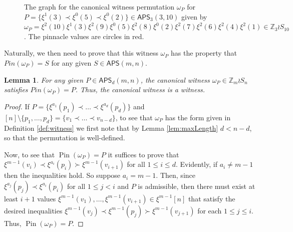 \documentclass[12pt,reqno]{amsart}
\numberwithin{equation}{section}
\theoremstyle{plain}
\newtheorem{lemma}[theorem]{Lemma}
\theoremstyle{definition}
\theoremstyle{remark}
\newcommand{\Z}{\mathbb{Z}}
\newcommand{\Pin}{\operatorname{Pin}}
\newcommand\APS{\mathsf{APS}}
\begin{document}
\begin{figure}[ht]
\caption{The graph for the canonical witness permutation $\omega_P$ for $P =\{\xi^1(3)\prec \xi^0(5)\prec \xi^0(2)\} \in \APS_3(3,10)$ given by
$\omega_P =\xi^2(10)\xi^1(3)\xi^2(9)\xi^0(5)\xi^2(8)\xi^0(2)\xi^2(7)\xi^2(6)\xi^2(4)\xi^2(1) \in \Z_3 \wr S_{10}$. The pinnacle values are circles in red.
}\label{fig:canonicalwitness}
\end{figure}

Naturally, we then need to prove that this witness $\omega_P$ has the property that $Pin(\omega_P) = S$ for any given $S\in \APS(m,n)$.


\begin{lemma}
For any given $P \in \APS_d(m, n)$, the canonical witness $\omega_P \in \Z_m \wr S_n$ satisfies $Pin(\omega_P) = P$. Thus, the canonical witness is a witness. 
\end{lemma}

\begin{proof}
If $P = \{ \xi^{a_1}(p_1) \prec \dots \prec \xi^{a_d}(p_d)\}$ and  $[n]\setminus \{p_1,\dots,p_d\}= \{v_1\prec \dots\prec v_{n-d}\}$, to see that $\omega_P$ has the form given in Definition \ref{def:witness} we first note that by Lemma \ref{lem:maxLength} $d<n-d$, so that the permutation is well-defined. 

Now, to see that $\Pin(\omega_P) =P$ it suffices to prove that $\xi^{m-1}(v_i) \prec \xi^{a_i}(p_i) \succ \xi^{m-1}(v_{i+1})$ for all $1\leq i \leq d$. Evidently, if $a_i \neq m-1$ then the inequalities hold. 
So suppose $a_i = m-1$. Then, since $\xi^{a_j}(p_j)\prec \xi^{a_i}(p_i)$ for all $1\leq j<i$ and $P$ is admissible, then there must exist at least $i+1$ values $\xi^{m-1}(v_1),\dots,\xi^{m-1}(v_{i+1})\in \xi^{m-1}[n]$ that satisfy the desired inequalities $\xi^{m-1}(v_j) \prec \xi^{m-1}(p_j) \succ \xi^{m-1}(v_{j+1})$ for each $ 1 \leq j \leq i$. Thus, $\Pin(\omega_P) =P$.
\end{proof}
\end{document}
